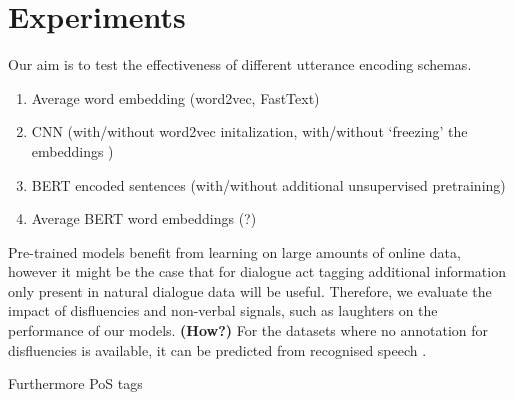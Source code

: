\documentclass[11pt,a4paper]{article}
\begin{document}
\section{Experiments}
Our aim is to test the effectiveness of different utterance encoding schemas. 
\begin{enumerate}
  \item Average word embedding (word2vec, FastText)
  \item CNN (with/without word2vec initalization, with/without `freezing' the embeddings )
  \item BERT encoded sentences (with/without additional unsupervised pretraining)
  \item Average BERT word embeddings (?)
  \end{enumerate}

  Pre-trained models benefit from learning on large amounts of online data, however it might be the case that for dialogue act tagging additional information only present in natural dialogue data will be useful. Therefore, we evaluate the impact of disfluencies and non-verbal signals, such as laughters on the performance of our models. \textbf{(How?)} For the datasets where no annotation for disfluencies is available, it can be predicted from recognised speech \citep{hough2017joint,shalyminov2018multi}.
  
  Furthermore PoS tags

{}

\end{document}
